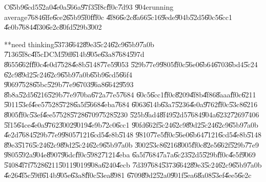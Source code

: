 %
\begin{center}

\end{center}%

C\U{65b9}\U{6cd5}\U{52a0}\U{4e0a}\U{566a}\U{97f3}\U{5f8c}\U{ff0c}\U{7d93}%
\U{904e}running average\U{7684}\U{6ffe}\U{6ce2}\U{65b9}\U{5f0f}\U{ff0c}%
\U{4f86}\U{6e2c}\U{8a66}\U{5c16}\U{9ede}\U{904b}\U{52d5}\U{60c5}\U{6cc1}%
\U{4e0b}\U{7684}\U{4f30}\U{6e2c}\U{80fd}\U{529b}\U{3002}

\bigskip

**need thinking\U{5373}\U{6642}\U{89e3}\U{5c24}\U{62c9}\U{65b9}\U{7a0b}%
\U{7136}\U{5f8c}\U{4f5c}DCM\U{59ff}\U{614b}\U{905e}\U{63a8}\U{7684}\U{597d}%
\U{8655}\U{662f}\U{ff0c}\U{4e0d}\U{7528}\U{4e8b}\U{5148}\U{77e5}\U{9053}%
\U{529b}\U{77e9}\U{9805}\U{ff0c}\U{56e0}\U{6b64}\U{6703}\U{6bd4}\U{5c24}%
\U{62c9}\U{89d2}\U{5c24}\U{62c9}\U{65b9}\U{7a0b}\U{65b9}\U{6cd5}\U{66f4}%
\U{9069}\U{7528}\U{65bc}\U{529b}\U{77e9}\U{6703}\U{96a8}\U{6642}\U{9593}%
\U{8b8a}\U{52d5}\U{6216}\U{529b}\U{77e9}\U{70ba}\U{672a}\U{77e5}\U{7684}%
\U{60c5}\U{6cc1}\U{ff0c}\U{8209}\U{4f8b}\U{4f86}\U{8aaa}\U{ff0c}\U{6211}%
\U{5011}\U{53ef}\U{4ee5}\U{7528}\U{5728}\U{6a5f}\U{5668}\U{4eba}\U{7684}%
\U{6063}\U{614b}\U{63a7}\U{5236}\U{4e0a}\U{9762}\U{ff0c}\U{53c8}\U{6216}%
\U{8005}\U{ff0c}\U{53ef}\U{4ee5}\U{7528}\U{5728}\U{6709}\U{7528}\U{5230}%
\U{525b}\U{9ad4}\U{8f49}\U{52d5}\U{7684}\U{904a}\U{6232}\U{7269}\U{7406}%
\U{5f15}\U{64ce}\U{4e0a}\U{9762}\U{3002}\U{9019}\U{4e9b}\U{72c0}\U{6cc1}%
\U{90fd}\U{662f}\U{5c24}\U{62c9}\U{89d2}\U{5c24}\U{62c9}\U{65b9}\U{7a0b}%
\U{4e2d}\U{7684}\U{529b}\U{77e9}\U{9805}\U{7121}\U{6cd5}\U{4e8b}\U{5148}%
\U{9810}\U{77e5}\U{ff0c}\U{56e0}\U{6b64}\U{7121}\U{6cd5}\U{4e8b}\U{5148}%
\U{89e3}\U{5176}\U{5c24}\U{62c9}\U{89d2}\U{5c24}\U{62c9}\U{65b9}\U{7a0b}%
\U{3002}\U{53c8}\U{6216}\U{8005}\U{ff0c}\U{82e5}\U{662f}\U{529b}\U{77e9}%
\U{9805}\U{592a}\U{904e}\U{8907}\U{96dc}\U{ff0c}\U{5982}\U{7121}\U{4eba}%
\U{6a5f}\U{7684}\U{7a7a}\U{6c23}\U{52d5}\U{529b}\U{ff0c}\U{4e5f}\U{9069}%
\U{5408}\U{4f7f}\U{7528}\U{6211}\U{5011}\U{9019}\U{908a}\U{6240}\U{4ecb}%
\U{7d39}\U{7684}\U{5373}\U{6642}\U{89e3}\U{5c24}\U{62c9}\U{65b9}\U{7a0b}%
\U{4e26}\U{4f5c}\U{59ff}\U{614b}\U{905e}\U{63a8}\U{ff0c}\U{53ea}\U{8981}%
\U{6709}\U{89d2}\U{52a0}\U{901f}\U{5ea6}\U{8a08}\U{53ef}\U{4ee5}\U{6e2c}%
